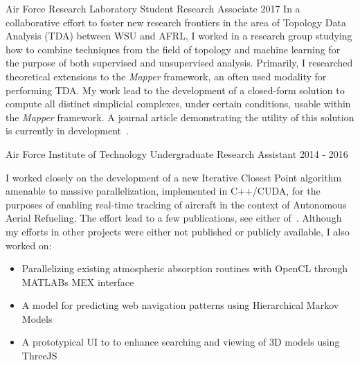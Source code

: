 \documentclass[11pt,a4paper,sans]{moderncv} %
\begin{document}
			 {Air Force Research Laboratory}
			 {Student Research Associate}
			 {2017}{}{\vspace{3pt}
			 In a collaborative effort to foster new research frontiers in the area of Topology Data Analysis (TDA) between WSU and AFRL, I worked in a research group studying how to combine techniques from  the field of topology and machine learning for the purpose of both supervised and unsupervised analysis. Primarily, I researched theoretical extensions to the \textit{Mapper} framework, an often used modality for performing TDA. My work lead to the development of a closed-form solution to compute all distinct simplicial complexes, under certain conditions, usable within the \textit{Mapper} framework. A journal article demonstrating the utility of this solution is currently in development~\cite{mapperext}. 
}

			 {Air Force Institute of Technology}
			 {Undergraduate Research Assistant}
			 {2014 - 2016}{}{\vspace{3pt}
I worked closely on the development of a new Iterative Closest Point algorithm amenable to massive parallelization, implemented in C++/CUDA, for the purposes of enabling real-time tracking of aircraft in the context of Autonomous Aerial Refueling. The effort lead to a few publications, see either of~\cite{piekenbrock2016automated, robinson2016parallelized}.
 Although my efforts in other projects were either not published or publicly available, I also worked on:
\begin{itemize}
	\item Parallelizing existing atmospheric absorption routines with OpenCL through MATLABs MEX interface
	\item A model for predicting web navigation patterns using Hierarchical Markov Models
	\item A prototypical UI to to enhance searching and viewing of 3D models using ThreeJS
\end{itemize}
}
\end{document}
